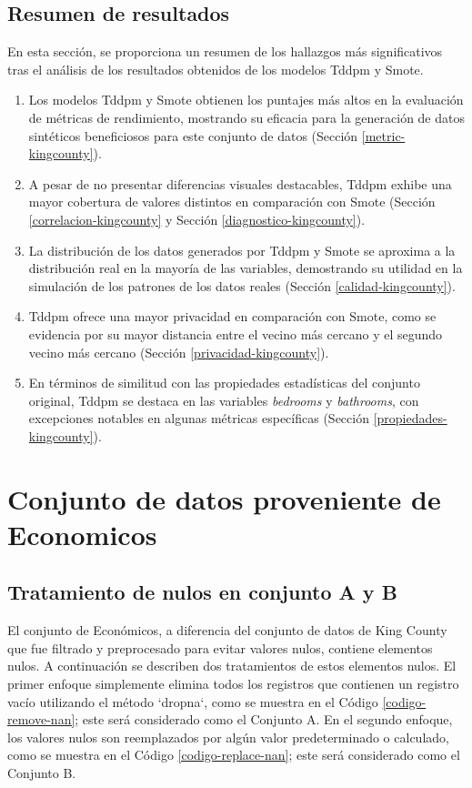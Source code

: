 \subsection{Resumen de resultados}
En esta sección, se proporciona un resumen de los hallazgos más significativos tras el análisis de los resultados obtenidos de los modelos Tddpm y Smote.

\begin{enumerate}
    \item Los modelos Tddpm y Smote obtienen los puntajes más altos en la evaluación de métricas de rendimiento, mostrando su eficacia para la generación de datos sintéticos beneficiosos para este conjunto de datos (Sección \ref{metric-kingcounty}).
    \item A pesar de no presentar diferencias visuales destacables, Tddpm exhibe una mayor cobertura de valores distintos en comparación con Smote (Sección \ref{correlacion-kingcounty} y Sección \ref{diagnostico-kingcounty}).
    \item La distribución de los datos generados por Tddpm y Smote se aproxima a la distribución real en la mayoría de las variables, demostrando su utilidad en la simulación de los patrones de los datos reales (Sección \ref{calidad-kingcounty}).
    \item Tddpm ofrece una mayor privacidad en comparación con Smote, como se evidencia por su mayor distancia entre el vecino más cercano y el segundo vecino más cercano (Sección \ref{privacidad-kingcounty}).
    \item En términos de similitud con las propiedades estadísticas del conjunto original, Tddpm se destaca en las variables \emph{bedrooms} y \emph{bathrooms}, con excepciones notables en algunas métricas específicas (Sección \ref{propiedades-kingcounty}).
\end{enumerate}





\newpage
\section{Conjunto de datos proveniente de Economicos}
\subsection{Tratamiento de nulos en conjunto A y B}
El conjunto de Económicos, a diferencia del conjunto de datos de King County que fue filtrado y preprocesado para evitar valores nulos, contiene elementos nulos. A continuación se describen dos tratamientos de estos elementos nulos. El primer enfoque simplemente elimina todos los registros que contienen un registro vacío utilizando el método `dropna`, como se muestra en el Código \ref{codigo-remove-nan}; este será considerado como el Conjunto A. En el segundo enfoque, los valores nulos son reemplazados por algún valor predeterminado o calculado, como se muestra en el Código \ref{codigo-replace-nan}; este será considerado como el Conjunto B.

